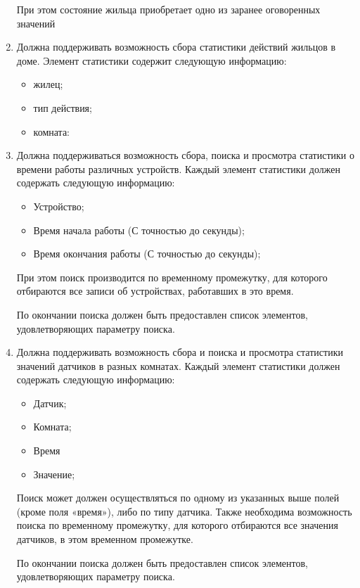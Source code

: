 \begin{enumerate}
          При этом состояние жильца приобретает  одно из заранее оговоренных значений
        \item Должна поддерживать возможность сбора статистики действий жильцов в доме. Элемент статистики содержит следующую информацию: 
            \begin{itemize}
              \item жилец;
	            \item тип действия;
	            \item комната: 
            \end{itemize}
        \item Должна поддерживаться возможность сбора, поиска и просмотра статистики о времени работы различных устройств. Каждый элемент статистики должен содержать следующую информацию:
          \begin{itemize}
            \item Устройство;
            \item Время начала работы (С точностью до секунды);
            \item Время окончания работы (С точностью до секунды);
          \end{itemize}
          При этом поиск производится по временному промежутку, для которого отбираются все записи об устройствах, работавших в это время.  
          
          По окончании поиска должен быть предоставлен список элементов, удовлетворяющих параметру поиска.
        \item Должна поддерживать возможность сбора и поиска и просмотра статистики значений датчиков в разных комнатах. Каждый элемент статистики должен содержать следующую информацию:
          \begin{itemize}
            \item Датчик;
	          \item Комната;
	          \item Время
	          \item Значение;
          \end{itemize}
          Поиск может должен осуществляться по одному из указанных выше полей (кроме поля «время»), либо по типу датчика. Также необходима возможность поиска по временному промежутку, для которого отбираются все значения датчиков, в этом временном промежутке.
          
          По окончании поиска должен быть предоставлен список элементов, удовлетворяющих параметру поиска. 
      \end{enumerate}
